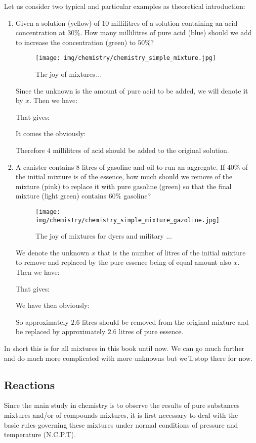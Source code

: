 	Let us consider two typical and particular examples as theoretical introduction:
	\begin{enumerate}
		\item Given a solution (yellow) of $10$ millilitres of a solution containing an acid concentration at $30\%$. How many millilitres of pure acid (blue) should we add to increase the concentration (green) to $50\%$?
		\begin{figure}[H]
			\begin{center}
			\texttt{[image: img/chemistry/chemistry\_simple\_mixture.jpg]}
			\end{center}	
			\caption{The joy of mixtures...}
		\end{figure}
		Since the unknown is the amount of pure acid to be added, we will denote it by $x$. Then we have:
		
		That gives:
		
		It comes the obviously:
		
		Therefore $4$ millilitres of acid should be added to the original solution.
		
		\item  A canister contains $8$ litres of gasoline and oil to run an aggregate. If $40\%$ of the initial mixture is of the essence, how much should we remove of the mixture (pink) to replace it with pure gasoline (green) so that the final mixture (light green) contains $60\%$ gasoline?
		\begin{figure}[H]
			\begin{center}
			\texttt{[image: img/chemistry/chemistry\_simple\_mixture\_gazoline.jpg]}
			\end{center}	
			\caption{The joy of mixtures for dyers and military ...}
		\end{figure}
		We denote the unknown $x$ that is the number of litres of the initial mixture to remove and replaced by the pure essence being of equal amount also $x$. Then we have:
		
		That gives:
		
		We have then obviously:
		
		So approximately $2.6$ litres should be removed from the original mixture and be replaced by approximately $2.6$ litres of pure essence.
	\end{enumerate}
	In short this is for all mixtures in this book until now. We can go much further and do much more complicated with more unknowns but we'll stop there for now.
	
	\subsection{Reactions}\label{chemical reactions}
	Since the main study in chemistry is to observe the results of pure substances mixtures and/or of compounds mixtures, it is first necessary to deal with  the basic rules governing these mixtures under normal conditions of pressure and temperature (N.C.P.T).
	
